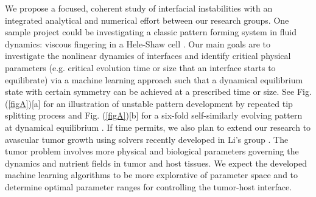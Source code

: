  We propose a focused, coherent study of interfacial instabilities with an integrated analytical and numerical effort between our research groups. One sample project could be investigating a classic pattern forming system in fluid dynamics: viscous fingering in a Hele-Shaw cell \cite{saffman1986}. Our main goals are to investigate the nonlinear dynamics of interfaces and identify critical physical parameters (e.g. critical evolution time or size that an interface starts to equilibrate) via a machine learning approach such that a dynamical equilibrium state with certain symmetry can be achieved at a prescribed time or size. See Fig. (\ref{figA})[a] for an illustration of unstable pattern development by repeated tip splitting process and Fig. (\ref{figA})[b] for a six-fold self-similarly evolving pattern at dynamical equilibrium \cite{Li2009}. If time permits, we also plan to extend our research to avascular tumor growth using solvers recently developed in Li's group \cite{MJ2020}. The tumor problem involves more physical and biological parameters governing the dynamics and nutrient fields in tumor and  host tissues. We expect the developed machine learning algorithms to be more explorative of parameter space and to determine optimal parameter ranges for controlling the tumor-host interface.

